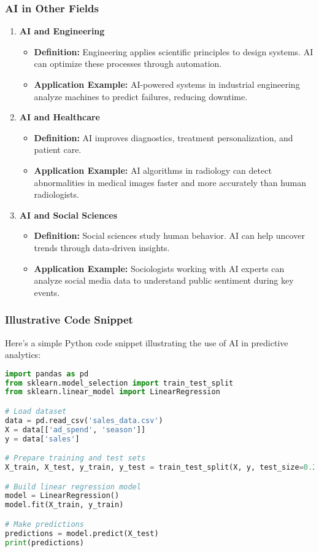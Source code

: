 \documentclass[aspectratio=169]{beamer}
\begin{document}
\begin{frame}
    \frametitle{AI in Other Fields}
    \begin{enumerate}
        \item \textbf{AI and Engineering}
            \begin{itemize}
                \item \textbf{Definition:} Engineering applies scientific principles to design systems. AI can optimize these processes through automation.
                \item \textbf{Application Example:} AI-powered systems in industrial engineering analyze machines to predict failures, reducing downtime.
            \end{itemize}
        
        \item \textbf{AI and Healthcare}
            \begin{itemize}
                \item \textbf{Definition:} AI improves diagnostics, treatment personalization, and patient care.
                \item \textbf{Application Example:} AI algorithms in radiology can detect abnormalities in medical images faster and more accurately than human radiologists.
            \end{itemize}
            
        \item \textbf{AI and Social Sciences}
            \begin{itemize}
                \item \textbf{Definition:} Social sciences study human behavior. AI can help uncover trends through data-driven insights.
                \item \textbf{Application Example:} Sociologists working with AI experts can analyze social media data to understand public sentiment during key events.
            \end{itemize}
    \end{enumerate}
\end{frame}

\begin{frame}[fragile]
    \frametitle{Illustrative Code Snippet}
    Here’s a simple Python code snippet illustrating the use of AI in predictive analytics:
    \begin{lstlisting}[language=Python]
import pandas as pd
from sklearn.model_selection import train_test_split
from sklearn.linear_model import LinearRegression

# Load dataset
data = pd.read_csv('sales_data.csv')
X = data[['ad_spend', 'season']]
y = data['sales']

# Prepare training and test sets
X_train, X_test, y_train, y_test = train_test_split(X, y, test_size=0.2, random_state=42)

# Build linear regression model
model = LinearRegression()
model.fit(X_train, y_train)

# Make predictions
predictions = model.predict(X_test)
print(predictions)
    \end{lstlisting}
\end{frame}
\end{document}
